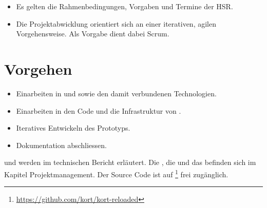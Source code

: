 \begin{itemize}
	\item Es gelten die Rahmenbedingungen, Vorgaben und Termine der HSR.
	\item Die Projektabwicklung orientiert sich an einer iterativen, agilen Vorgehensweise. 
	Als Vorgabe dient dabei Scrum.
\end{itemize}

\section{Vorgehen}
\begin{itemize}
	\item Einarbeiten in  und  sowie den damit verbundenen Technologien.
	\item Einarbeiten in den Code und die Infrastruktur von \kort{}.
	\item Iteratives Entwickeln des Prototyps.
	\item Dokumentation abschliessen.
\end{itemize}

 und  werden im technischen Bericht erläutert.
Die , die  und das  befinden sich im Kapitel Projektmanagement. 
Der Source Code ist auf \footnote{\url{https://github.com/kort/kort-reloaded}} frei zugänglich. 
